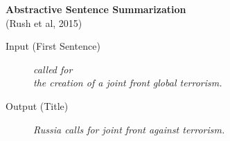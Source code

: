 \documentclass[aspectratio=169]{beamer}
\newcommand{\air}{\vspace{0.25cm}}
\newcommand{\mair}{\vspace{-0.25cm}}
\begin{document}
\begin{frame}
  \begin{center}
    \textbf{Abstractive Sentence Summarization } \\
\small{ (Rush et al, 2015)}
  \end{center}
    \air

      Input (First Sentence)

  \begin{figure}
    \textit{
      called  for \\ the creation of
      a joint front  global terrorism. }
  \end{figure}

    Output (Title)
  \mair

  \begin{figure}
    \centering
    \textit{\alert{Russia} calls for joint
      front \alert{against} terrorism.}
  \end{figure}

\end{frame}
\end{document}
